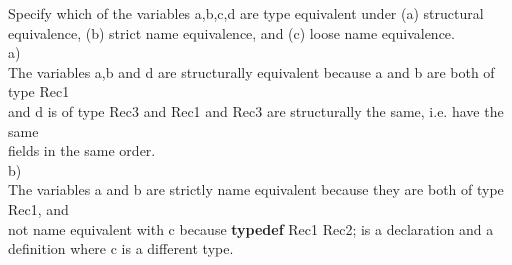 \documentclass[12pt]{article}
\begin{document}
\begin{flushleft}

Specify which of the variables {\selectfont a,b,c,d } are type equivalent under (a) structural equivalence, (b) strict name equivalence, and (c) loose name equivalence.\\
[2mm]

\qquad a)\\
\qquad \qquad The variables {\selectfont a,b} and {\selectfont d} are structurally equivalent because {\selectfont a} and {\selectfont b} are both of type {\selectfont Rec1}\\
\qquad \qquad and {\selectfont d} is of type {\selectfont Rec3} and {\selectfont Rec1} and {\selectfont Rec3} are structurally the same, i.e. have the same\\
\qquad \qquad  fields in the same order.\\
[2mm]

\qquad b)\\
\qquad \qquad The variables {\selectfont a} and {\selectfont b} are strictly name equivalent because they are both of type {\selectfont Rec1}, and\\
\qquad \qquad not name equivalent with {\selectfont c} because {\selectfont \textbf{typedef} Rec1 Rec2;} is a declaration and a\\
\qquad \qquad definition where {\selectfont c} is a different type.\\
[2mm]


\end{flushleft}
\end{document}

